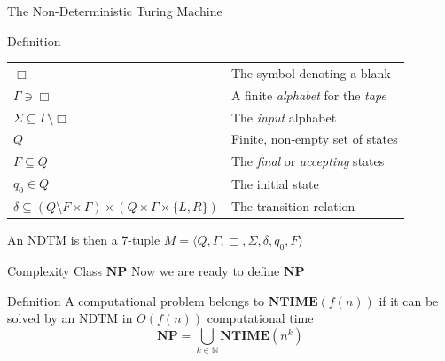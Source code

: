 \documentclass[handout]{beamer}
\newcommand{\Natural}{\mathbb{N}}
\newcommand{\NPTIME}{\mathbf{NP}}
\newcommand{\NTIME}{\mathbf{NTIME}}
\begin{document}
  \begin{frame}{The Non-Deterministic Turing Machine}
      \pause
      \begin{block}{Definition}
          \pause
          \begin{table}[]
              \centering
              \begin{tabular}{ll}
                  $\Box$ & The symbol denoting a blank \pause \\
                  $\Gamma \ni \Box$
                  & A finite \textit{alphabet} for the \textit{tape} \pause \\
                  $\Sigma \subseteq \Gamma \setminus \Box$ 
                  & The \textit{input} alphabet \pause \\
                  $Q$ & Finite, non-empty set of states \pause \\
                  $F \subseteq Q$
                  & The \textit{final} or \textit{accepting} states \pause \\
                  $q_0 \in Q$ & The initial state \pause \\
                  $\delta \subseteq (Q \setminus F \times \Gamma ) \times (Q
                  \times \Gamma \times \{L, R\})$ & The transition relation
              \end{tabular}
          \end{table}
          \pause
          An NDTM is then a 7-tuple
          $M = \langle Q, \Gamma, \Box, \Sigma, \delta, q_0, F \rangle$
      \end{block}
  \end{frame}
  \begin{frame}{Complexity Class $\NPTIME$}
      Now we are ready to define $\NPTIME$
      \pause
      \begin{block}{Definition}
          A computational problem belongs to
              $\NTIME\left(f(n)\right)$ if it can be solved by an
              NDTM in $O(f(n))$ computational time 
              \pause
          $$\NPTIME = \bigcup_{k \in \Natural}
              \NTIME\left(n^k\right)$$
      \end{block}
  \end{frame}
\end{document}
